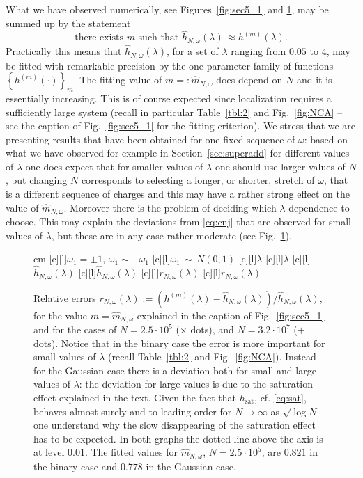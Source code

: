 \documentclass[reqno,11pt]{amsart}
\numberwithin{equation}{section}
\newcommand{\go}{\omega}
\newcommand{\gl}{\lambda}
\begin{document}
What we have observed numerically, see Figures~\ref{fig:sec5_1} and \ref{fig:sec5_2},
may be summed up by
the statement
\begin{equation}
\label{eq:cnj}
\text{there exists } m \text{ such that }
\hat h _{N, \go} (\gl) \, \approx h^{(m)}(\gl).
\end{equation}
Practically this means that $\hat h _{N, \go} (\gl)$, for a set of $\gl$
ranging from $0.05$ to $4$, may be fitted with remarkable precision
by the one parameter family of functions $\left\{ h^{(m)}(\cdot)\right\}_m$.
The fitting value of $m=: \hat m_{N, \go}$ does depend on $N$ and it is essentially increasing.
This is of course expected since localization requires a sufficiently large
system (recall in particular Table~\ref{tbl:2} and Fig.~\ref{fig:NCA} -- see the caption of
Fig.~\ref{fig:sec5_1} for the fitting criterion).
We stress that we are presenting results that have been obtained for one
fixed sequence of $\go$: based on what we have observed for example
in Section~\ref{sec:superadd} for different values of $\gl$ one does expect that
for smaller values of $\gl$ one should use larger values of $N$, but
 changing $N$ corresponds to selecting
a longer, or shorter, stretch of $\go$, that is a different sequence of charges
and this may have a rather strong effect on the value of $\hat m_{N, \go}$.
Moreover there is the problem of deciding which $\gl$-dependence to choose. This may explain
the deviations from \eqref{eq:cnj} that are observed for small values of $\gl$, but these
are in any case rather moderate (see Fig.~\ref{fig:sec5_2}).
\smallskip

 \begin{figure}[h]
\begin{center}
\leavevmode
{} cm
\psfragscanon
{}[c][l]{\small $\go_1 =\pm 1, \, \go_1 \sim -\go_1 $}
[c][l]{$\go_1 \, \sim \, N(0,1)$}
[c][l]{$\gl$}
[c][l]{$\gl$}
[c][l]{$\hat h _{N,\go}(\gl)$}
[c][l]{$\hat h _{N,\go}(\gl)$}
[c][l]{$r_{N,\go}(\gl)$}
[c][l]{$r_{N,\go}(\gl)$}
\end{center}
\caption{
\label{fig:sec5_2}
Relative errors $r_{N,\go}(\gl):= \left( h^{(m)}(\gl) -\hat h _{N, \go} (\gl) \right)/\hat h _{N, \go} (\gl)$,
for the value $m=\hat m_{N,\go}$ explained in the caption of Fig.~\ref{fig:sec5_1} and
for the cases of $N=2.5\cdot 10^5$ ($\times$ dots), and $N=3.2\cdot 10^7$ ($+$ dots).
Notice that in the binary case the error is more important for small values of $\gl$ (recall
Table~\ref{tbl:2} and Fig.~\ref{fig:NCA}). Instead for the Gaussian case there is a deviation
both for small and large values of $\gl$: the deviation for large values is due to
the saturation effect explained in the text. Given the fact that $h_{\text{sat}}$, cf. \eqref{eq:sat},
behaves almost surely and to leading order for $N \to \infty$ as $\sqrt{\log N}$ one
understand  why the slow disappearing of the saturation effect has to be expected.
In both graphs the dotted line above the axis is at level $0.01$.
The fitted values for $\hat m_{N, \go}$, $N=  2.5\cdot 10^5$, are $0.821$ in the binary case
and $0.778$ in the Gaussian case.
}
\end{figure}
\end{document}

